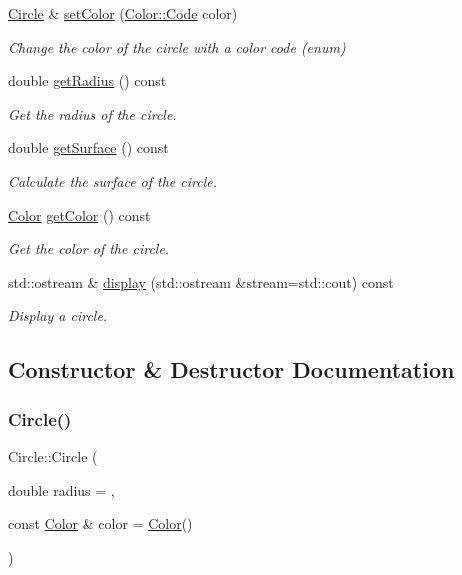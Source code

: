 \begin{DoxyCompactItemize}
\hyperlink{classCircle}{Circle} \& \hyperlink{classCircle_aeff5f4c8614715508b9224fbf9b8a62d}{set\+Color} (\hyperlink{classColor_a20a7b04657c1d83fae5d54514d3f1622}{Color\+::\+Code} color)
\begin{DoxyCompactList}\small\item\em Change the color of the circle with a color code (enum) \end{DoxyCompactList}\item 
double \hyperlink{classCircle_a58eb59828b4459ca38932b87c65f03a9}{get\+Radius} () const
\begin{DoxyCompactList}\small\item\em Get the radius of the circle. \end{DoxyCompactList}\item 
double \hyperlink{classCircle_a1c83fc4e8df86bc91239462210f3b2d3}{get\+Surface} () const
\begin{DoxyCompactList}\small\item\em Calculate the surface of the circle. \end{DoxyCompactList}\item 
\hyperlink{classColor}{Color} \hyperlink{classCircle_a07a3c058df52ca4294103fd965490f12}{get\+Color} () const
\begin{DoxyCompactList}\small\item\em Get the color of the circle. \end{DoxyCompactList}\item 
std\+::ostream \& \hyperlink{classCircle_ab8b37180fc8799e9422f659d4ab0a9da}{display} (std\+::ostream \&stream=std\+::cout) const
\begin{DoxyCompactList}\small\item\em Display a circle. \end{DoxyCompactList}\end{DoxyCompactItemize}


\subsection{Constructor \& Destructor Documentation}
\mbox{\label{classCircle_a47da8474569bafdf019ff4063a69bc0c}} 
\subsubsection{\texorpdfstring{Circle()}{Circle()}\hspace{0.1cm}{\footnotesize\ttfamily [1/3]}}
{\footnotesize\ttfamily Circle\+::\+Circle (\begin{DoxyParamCaption}\item[{double}]{radius = {},  }\item[{const \hyperlink{classColor}{Color} \&}]{color = {\ttfamily \hyperlink{classColor}{Color}()} }\end{DoxyParamCaption})}



